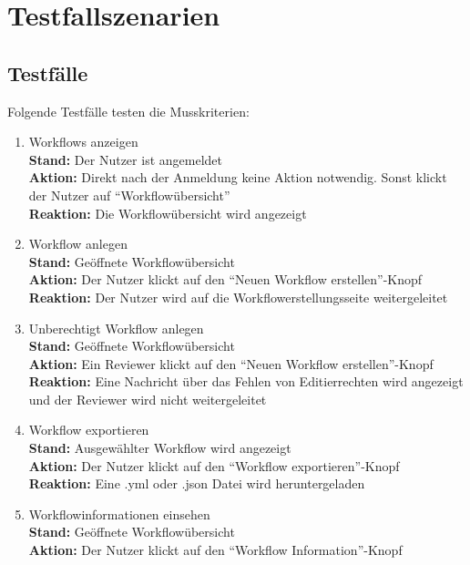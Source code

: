 \chapter{Testfallszenarien}

\section{Testfälle}
Folgende Testfälle testen die Musskriterien:
\renewcommand{\labelenumi}{/T\arabic{enumi}0/}
\begin{enumerate}
    \item Workflows anzeigen
        \\ \textbf{Stand:} Der \Gls{Nutzer} ist angemeldet
        \\ \textbf{Aktion:} Direkt nach der Anmeldung keine Aktion notwendig. Sonst klickt der \Gls{Nutzer} auf \enquote{Workflowübersicht}
        \\ \textbf{Reaktion:} Die Workflowübersicht wird angezeigt
    \item Workflow anlegen
        \\ \textbf{Stand:} Geöffnete Workflowübersicht
        \\ \textbf{Aktion:} Der \Gls{Nutzer} klickt auf den \enquote{Neuen Workflow erstellen}-Knopf
        \\ \textbf{Reaktion:} Der \Gls{Nutzer} wird auf die Workflowerstellungsseite weitergeleitet
    \item Unberechtigt Workflow anlegen
        \\ \textbf{Stand:} Geöffnete Workflowübersicht
        \\ \textbf{Aktion:} Ein \Gls{Reviewer} klickt auf den \enquote{Neuen Workflow erstellen}-Knopf
        \\ \textbf{Reaktion:} Eine Nachricht über das Fehlen von Editierrechten wird angezeigt und der \Gls{Reviewer} wird nicht weitergeleitet
    \item Workflow exportieren
        \\ \textbf{Stand:} Ausgewählter Workflow wird angezeigt
        \\ \textbf{Aktion:} Der \gls{Nutzer} klickt auf den \enquote{Workflow exportieren}-Knopf
        \\ \textbf{Reaktion:} Eine .yml oder .json Datei wird heruntergeladen
    \item Workflowinformationen einsehen
        \\ \textbf{Stand:} Geöffnete Workflowübersicht
        \\ \textbf{Aktion:} Der \gls{Nutzer} klickt auf den \enquote{Workflow Information}-Knopf

\end{enumerate}
